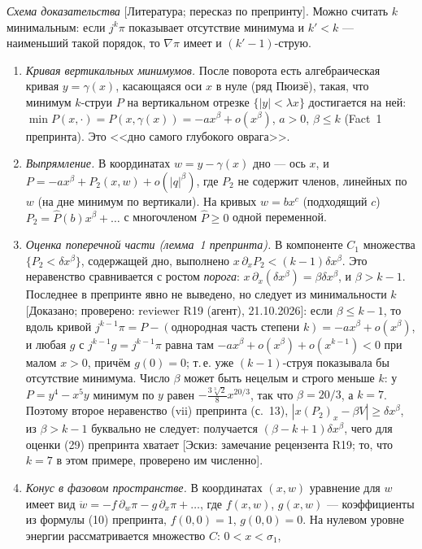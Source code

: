\documentclass[11pt,a4paper]{article}
\theoremstyle{definition}
\newcommand{\mk}[1]{\textsf{[#1]}}
\begin{document}
\emph{Схема доказательства} \mk{Литература; пересказ по препринту}. Можно считать $k$
минимальным: если $j^k\pi$ показывает отсутствие минимума и $k'<k$ --- наименьший такой порядок, то
$\nabla\pi$ имеет и $(k'-1)$-струю.
\begin{enumerate}[leftmargin=*]
\item \emph{Кривая вертикальных минимумов.} После поворота есть алгебраическая кривая
$y=\gamma(x)$, касающаяся оси $x$ в нуле (ряд Пюизё), такая, что минимум $k$-струи $P$ на
вертикальном отрезке $\{|y|<\lambda x\}$ достигается на ней: $\min P(x,\cdot)=P(x,\gamma(x))=-ax^\beta+o(x^\beta)$,
$a>0$, $\beta\le k$ (Fact~1 препринта). Это <<дно самого глубокого оврага>>.
\item \emph{Выпрямление.} В координатах $w=y-\gamma(x)$ дно --- ось $x$, и $P=-ax^\beta+P_2(x,w)+o(|q|^\beta)$,
где $P_2$ не содержит членов, линейных по $w$ (на дне минимум по вертикали). На кривых
$w=bx^c$ (подходящий $c$) $P_2=\hat P(b)x^\beta+\dots$ с многочленом $\hat P\ge0$ одной переменной.
\item \emph{Оценка поперечной части (лемма~1 препринта).} В компоненте $C_1$ множества
$\{P_2<\delta x^\beta\}$, содержащей дно, выполнено $x\,\partial_xP_2<(k-1)\delta x^\beta$. Это неравенство
сравнивается с ростом \emph{порога}: $x\,\partial_x(\delta x^\beta)=\beta\delta x^\beta$, и $\beta>k-1$. Последнее в
препринте явно не выведено, но следует из минимальности $k$ \mk{Доказано; проверено: reviewer R19
(агент), 21.10.2026}: если $\beta\le k-1$, то
вдоль кривой $j^{k-1}\pi=P-(\text{однородная часть степени }k)=-ax^\beta+o(x^\beta)$, и любая $g$ с
$j^{k-1}g=j^{k-1}\pi$ равна там $-ax^\beta+o(x^\beta)+o(x^{k-1})<0$ при малом $x>0$, причём $g(0)=0$; т.\,е.
уже $(k-1)$-струя показывала бы отсутствие минимума. Число $\beta$ может быть нецелым и строго меньше
$k$: у $P=y^4-x^5y$ минимум по $y$ равен $-\frac{3\sqrt[3]2}{8}x^{20/3}$, так что $\beta=20/3$, а $k=7$.
Поэтому второе неравенство (vii) препринта (с.~13), $|x(P_2)_x-\beta V|\ge\delta x^\beta$, из $\beta>k-1$
буквально не следует: получается $(\beta-k+1)\delta x^\beta$, чего для оценки (29) препринта хватает
\mk{Эскиз: замечание рецензента R19; то, что $k=7$ в этом примере, проверено им численно}.
\item \emph{Конус в фазовом пространстве.} В координатах $(x,w)$ уравнение для $w$ имеет вид
$\ddot w=-f\,\partial_w\pi-g\,\partial_x\pi+\dots$, где $f(x,w)$, $g(x,w)$ --- коэффициенты из формулы (10)
препринта, $f(0,0)=1$, $g(0,0)=0$. На нулевом уровне энергии рассматривается множество $C$: $0<x<\sigma_1$,

\end{enumerate}
\end{document}
